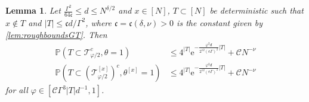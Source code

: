 \documentclass[11pt]{article}
\newcommand{\ee}{\mathrm{e}}
\newcommand{\abs}[1]{\left| #1 \right|}
\newcommand{\ccc}{\mathfrak{c}}
\theoremstyle{plain}
\newtheorem{lemma}{Lemma}[section]
\theoremstyle{remark}
\numberwithin{equation}{section}
\newcommand*\bset[1]{[#1]}
\begin{document}
	\begin{lemma}\label{lemma:deterministicsetaretypical} 
	 Let $ \frac{\Gamma^2}{64 \mathfrak c} \leq d \leq N^{\delta/2}$ and $x\in [N]$, $ T \subset[N]$ be deterministic  such that $x \notin T$ and $\abs{T} \le \ccc    d/ \Gamma^2 $, where $\ccc= \ccc(\delta,\nu)>0$ is the constant given by \cref{lem:roughboundsGT}. Then  
		\begin{align}
			\mathbb{P} \left( T \subset \mathcal{T}_{\varphi/2}^c,\theta =1 \right) &\le  4^{|T|} \ee^{-\frac{\varphi^2d}{2^{12} (\ee\Gamma)^2}|T|} + \mathcal{C}N^{- \nu} \label{eq:bound_P_T_subset_atypical} \\
			\mathbb{P} \left( T \subset \left(\mathcal{T}^{\bset{x}}_{ \varphi/2}\right)^c,\theta^{\bset{x}} =1 \right) &\le 4^{|T|} \ee^{-\frac{\varphi^2d}{2^{12} (\ee\Gamma)^2}|T|} + \mathcal{C}N^{- \nu}
			\label{eq:bound_P_T_subset_atypical_without_x}
		\end{align}
	for all $ \varphi \in [\mathcal C \Gamma^3 \abs{T} d^{-1},1]$.
	\end{lemma}
\end{document}
